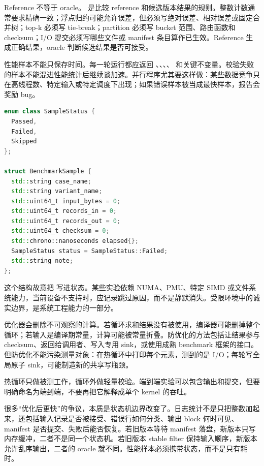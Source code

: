 Reference 不等于 oracle。 是比较 reference 和候选版本结果的规则。整数计数通常要求精确一致；浮点归约可能允许误差，但必须写绝对误差、相对误差或固定合并树；top-k 必须写 tie-break；partition 必须写 bucket 范围、路由函数和 checksum；I/O 提交必须写哪些文件或 manifest 条目算作已生效。Reference 生成正确结果，oracle 判断候选结果是否可接受。

性能样本不能只保存时间。每一轮运行都应返回 、、、、 和关键不变量。校验失败的样本不能混进性能统计后继续谈加速。并行程序尤其要这样做：某些数据竞争只在高线程数、特定输入或特定调度下出现；如果错误样本被当成最快样本，报告会奖励 bug。

\begin{lstlisting}[language=C++,caption={BenchmarkSample 的最小形态}]
enum class SampleStatus {
  Passed,
  Failed,
  Skipped
};

struct BenchmarkSample {
  std::string case_name;
  std::string variant_name;
  std::uint64_t input_bytes = 0;
  std::uint64_t records_in = 0;
  std::uint64_t records_out = 0;
  std::uint64_t checksum = 0;
  std::chrono::nanoseconds elapsed{};
  SampleStatus status = SampleStatus::Failed;
  std::string note;
};
\end{lstlisting}

这个结构故意把  写进状态。某些实验依赖 NUMA、PMU、特定 SIMD 或文件系统能力，当前设备不支持时，应记录跳过原因，而不是静默消失。受限环境中的诚实边界，是系统工程能力的一部分。

优化器会删除不可观察的计算。若循环求和结果没有被使用，编译器可能删掉整个循环；若输入是编译期常量，计算可能被常量折叠。防优化的方法包括让结果参与 checksum、返回给调用者、写入专用 sink，或使用成熟 benchmark 框架的接口。但防优化不能污染测量对象：在热循环中打印每个元素，测到的是 I/O；每轮写全局原子 sink，可能制造新的共享写瓶颈。

热循环只做被测工作，循环外做轻量校验。端到端实验可以包含输出和提交，但要明确命名为端到端，不要再把它解释成单个 kernel 的吞吐。

很多“优化后更快”的争议，本质是状态机边界改变了。日志统计不是只把整数加起来，还包括输入记录是否被接受、错误行如何分类、输出 block 何时可见、manifest 是否提交、失败后能否恢复。若旧版本等待 manifest 落盘，新版本只写内存缓冲，二者不是同一个状态机。若旧版本 stable filter 保持输入顺序，新版本允许乱序输出，二者的 oracle 就不同。性能样本必须携带状态，而不是只有耗时。


